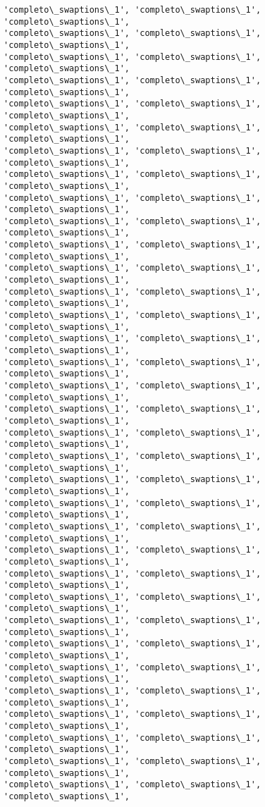 \documentclass[11pt]{article}
\begin{document}
\begin{Verbatim}[commandchars=\\\{\}]
'completo\_swaptions\_1', 'completo\_swaptions\_1', 'completo\_swaptions\_1',
'completo\_swaptions\_1', 'completo\_swaptions\_1', 'completo\_swaptions\_1',
'completo\_swaptions\_1', 'completo\_swaptions\_1', 'completo\_swaptions\_1',
'completo\_swaptions\_1', 'completo\_swaptions\_1', 'completo\_swaptions\_1',
'completo\_swaptions\_1', 'completo\_swaptions\_1', 'completo\_swaptions\_1',
'completo\_swaptions\_1', 'completo\_swaptions\_1', 'completo\_swaptions\_1',
'completo\_swaptions\_1', 'completo\_swaptions\_1', 'completo\_swaptions\_1',
'completo\_swaptions\_1', 'completo\_swaptions\_1', 'completo\_swaptions\_1',
'completo\_swaptions\_1', 'completo\_swaptions\_1', 'completo\_swaptions\_1',
'completo\_swaptions\_1', 'completo\_swaptions\_1', 'completo\_swaptions\_1',
'completo\_swaptions\_1', 'completo\_swaptions\_1', 'completo\_swaptions\_1',
'completo\_swaptions\_1', 'completo\_swaptions\_1', 'completo\_swaptions\_1',
'completo\_swaptions\_1', 'completo\_swaptions\_1', 'completo\_swaptions\_1',
'completo\_swaptions\_1', 'completo\_swaptions\_1', 'completo\_swaptions\_1',
'completo\_swaptions\_1', 'completo\_swaptions\_1', 'completo\_swaptions\_1',
'completo\_swaptions\_1', 'completo\_swaptions\_1', 'completo\_swaptions\_1',
'completo\_swaptions\_1', 'completo\_swaptions\_1', 'completo\_swaptions\_1',
'completo\_swaptions\_1', 'completo\_swaptions\_1', 'completo\_swaptions\_1',
'completo\_swaptions\_1', 'completo\_swaptions\_1', 'completo\_swaptions\_1',
'completo\_swaptions\_1', 'completo\_swaptions\_1', 'completo\_swaptions\_1',
'completo\_swaptions\_1', 'completo\_swaptions\_1', 'completo\_swaptions\_1',
'completo\_swaptions\_1', 'completo\_swaptions\_1', 'completo\_swaptions\_1',
'completo\_swaptions\_1', 'completo\_swaptions\_1', 'completo\_swaptions\_1',
'completo\_swaptions\_1', 'completo\_swaptions\_1', 'completo\_swaptions\_1',
'completo\_swaptions\_1', 'completo\_swaptions\_1', 'completo\_swaptions\_1',
'completo\_swaptions\_1', 'completo\_swaptions\_1', 'completo\_swaptions\_1',
'completo\_swaptions\_1', 'completo\_swaptions\_1', 'completo\_swaptions\_1',
'completo\_swaptions\_1', 'completo\_swaptions\_1', 'completo\_swaptions\_1',
'completo\_swaptions\_1', 'completo\_swaptions\_1', 'completo\_swaptions\_1',
'completo\_swaptions\_1', 'completo\_swaptions\_1', 'completo\_swaptions\_1',
'completo\_swaptions\_1', 'completo\_swaptions\_1', 'completo\_swaptions\_1',
'completo\_swaptions\_1', 'completo\_swaptions\_1', 'completo\_swaptions\_1',
'completo\_swaptions\_1', 'completo\_swaptions\_1', 'completo\_swaptions\_1',
'completo\_swaptions\_1', 'completo\_swaptions\_1', 'completo\_swaptions\_1',

\end{Verbatim}
\end{document}
